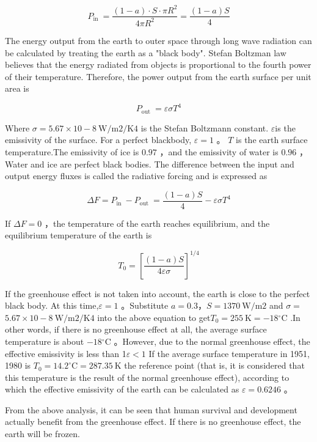 \documentclass{apmcmthesis}
\begin{document}
$$
P_{\text {in }}=\frac{(1-a) \cdot S \cdot \pi R^2}{4 \pi R^2}=\frac{(1-a) S}{4}
$$

The energy output from the earth to outer space through long wave radiation can be calculated by treating the earth as a "black body". Stefan Boltzman law believes that the energy radiated from objects is proportional to the fourth power of their temperature. Therefore, the power output from the earth surface per unit area is

$$
P_{\text {out }}=\varepsilon \sigma T^4
$$

Where $\sigma=5.67 \times 10-8 \mathrm{~W} / \mathrm{m} 2 / \mathrm{K} 4$ is the Stefan Boltzmann constant. $\varepsilon$is the emissivity of the surface. For a perfect blackbody, $\varepsilon=1$ 。 $T$ is the earth surface temperature.The emissivity of ice is  $0.97$ ，and the emissivity of water is  $0.96$ ， Water and ice are perfect black bodies. The difference between the input and output energy fluxes is called the radiative forcing and is expressed as

$$
\Delta F=P_{\text {in }}-P_{\text {out }}=\frac{(1-a) S}{4}-\varepsilon \sigma T^4
$$

If $\Delta F=0$ ，the temperature of the earth reaches equilibrium, and the equilibrium temperature of the earth is

$$
T_0=\left[\frac{(1-a) S}{4 \varepsilon \sigma}\right]^{1 / 4}
$$

If the greenhouse effect is not taken into account, the earth is close to the perfect black body. At this time,$\varepsilon=1$ 。Substitute $a=0.3 ， S=1370 \mathrm{~W} / \mathrm{m} 2$ and $\sigma=$ $5.67 \times 10-8 \mathrm{~W} / \mathrm{m} 2 / \mathrm{K} 4$ into the above equation to get$T_0=255 \mathrm{~K}=-18{ }^{\circ} \mathrm{C}$  .In other words, if there is no greenhouse effect at all, the average surface temperature is about $-18{ }^{\circ} \mathrm{C}$ 。However, due to the normal greenhouse effect, the effective emissivity is less than 1$\varepsilon<1$ If the average surface temperature in 1951, 1980 is  $T_0=14.2^{\circ} \mathrm{C}=287.35 \mathrm{~K}$  the reference point (that is, it is considered that this temperature is the result of the normal greenhouse effect), according to which the effective emissivity of the earth can be calculated as $\varepsilon=0.6246$ 。

From the above analysis, it can be seen that human survival and development actually benefit from the greenhouse effect. If there is no greenhouse effect, the earth will be frozen.
\end{document}
